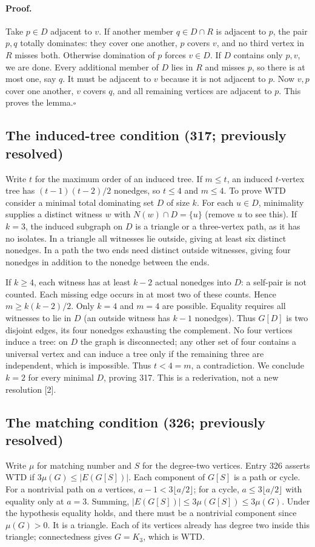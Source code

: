 \documentclass[11pt,a4paper]{article}
\numberwithin{equation}{section}
\theoremstyle{definition}
\theoremstyle{remark}
\begin{document}
\paragraph{Proof.}
Take $p\in D$ adjacent to $v$. If another member $q\in D\cap R$
is adjacent to $p$, the pair $p,q$ totally dominates: they cover one
another, $p$ covers $v$, and no third vertex in $R$ misses both.
Otherwise domination of $p$ forces $v\in D$. If $D$ contains only
$p,v$, we are done. Every additional member of $D$ lies in $R$ and
misses $p$, so there is at most one, say $q$. It must be adjacent to
$v$ because it is not adjacent to $p$. Now $v,p$ cover one another,
$v$ covers $q$, and all remaining vertices are adjacent to $p$.
This proves the lemma.\hfill$\square$

\subsection*{The induced-tree condition (317; previously resolved)}
Write $t$ for the maximum order of an induced tree. If $m\le t$, an
induced $t$-vertex tree has $(t-1)(t-2)/2$ nonedges, so $t\le4$ and
$m\le4$. To prove WTD consider a minimal total dominating set $D$
of size $k$. For each $u\in D$, minimality supplies a distinct witness
$w$ with $N(w)\cap D=\{u\}$ (remove $u$ to see this).
If $k=3$, the induced subgraph on $D$ is a triangle or a three-vertex
path, as it has no isolates. In a triangle all witnesses lie outside,
giving at least six distinct nonedges. In a path the two ends need
distinct outside witnesses, giving four nonedges in addition to the
nonedge between the ends.

If $k\ge4$, each witness has at least $k-2$ actual nonedges into $D$:
a self-pair is not counted. Each missing edge occurs in at most two of
these counts. Hence $m\ge k(k-2)/2$. Only $k=4$ and $m=4$ are possible.
Equality requires all witnesses to lie in $D$ (an outside witness
has $k-1$ nonedges). Thus $G[D]$ is two disjoint edges, its four
nonedges exhausting the complement. No four vertices induce a tree:
on $D$ the graph is disconnected; any other set of four contains
a universal vertex and can induce a tree only if the remaining three
are independent, which is impossible. Thus $t<4=m$, a contradiction.
We conclude $k=2$ for every minimal $D$, proving 317.
This is a rederivation, not a new resolution [2].

\subsection*{The matching condition (326; previously resolved)}
Write $\mu$ for matching number and $S$ for the degree-two vertices.
Entry 326 asserts WTD if $3\mu(G)\le |E(G[S])|$. Each component
of $G[S]$ is a path or cycle. For a nontrivial path on $a$ vertices,
$a-1<3\lfloor a/2\rfloor$; for a cycle,
$a\le3\lfloor a/2\rfloor$ with equality only at $a=3$. Summing,
$|E(G[S])|\le3\mu(G[S])\le3\mu(G)$. Under the hypothesis equality
holds, and there must be a nontrivial component since $\mu(G)>0$.
It is a triangle. Each of its vertices already has degree two
inside this triangle; connectedness gives $G=K_3$, which is WTD.
\end{document}
